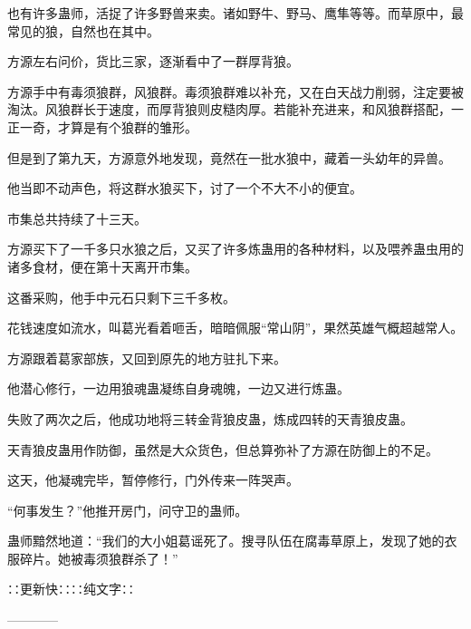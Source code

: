 \begin{this_body}
也有许多蛊师，活捉了许多野兽来卖。诸如野牛、野马、鹰隼等等。而草原中，最常见的狼，自然也在其中。

方源左右问价，货比三家，逐渐看中了一群厚背狼。

方源手中有毒须狼群，风狼群。毒须狼群难以补充，又在白天战力削弱，注定要被淘汰。风狼群长于速度，而厚背狼则皮糙肉厚。若能补充进来，和风狼群搭配，一正一奇，才算是有个狼群的雏形。

但是到了第九天，方源意外地发现，竟然在一批水狼中，藏着一头幼年的异兽。

他当即不动声色，将这群水狼买下，讨了一个不大不小的便宜。

市集总共持续了十三天。

方源买下了一千多只水狼之后，又买了许多炼蛊用的各种材料，以及喂养蛊虫用的诸多食材，便在第十天离开市集。

这番采购，他手中元石只剩下三千多枚。

花钱速度如流水，叫葛光看着咂舌，暗暗佩服“常山阴”，果然英雄气概超越常人。

方源跟着葛家部族，又回到原先的地方驻扎下来。

他潜心修行，一边用狼魂蛊凝练自身魂魄，一边又进行炼蛊。

失败了两次之后，他成功地将三转金背狼皮蛊，炼成四转的天青狼皮蛊。

天青狼皮蛊用作防御，虽然是大众货色，但总算弥补了方源在防御上的不足。

这天，他凝魂完毕，暂停修行，门外传来一阵哭声。

“何事发生？”他推开房门，问守卫的蛊师。

蛊师黯然地道：“我们的大小姐葛谣死了。搜寻队伍在腐毒草原上，发现了她的衣服碎片。她被毒须狼群杀了！”

∷更新快∷∷纯文字∷

------------

\end{this_body}

